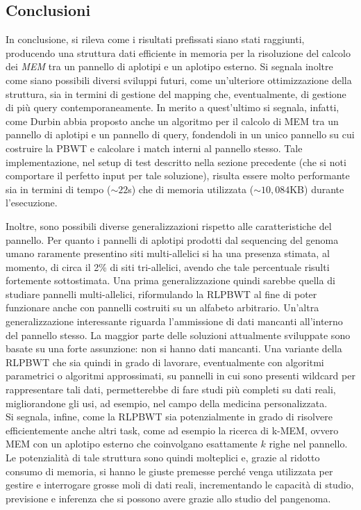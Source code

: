 \documentclass[a4paper,11pt, oneside,italian]{article}
\begin{document}
\subsection*{Conclusioni}
In conclusione, si rileva come i risultati prefissati siano stati raggiunti,
producendo una struttura dati efficiente in memoria per la risoluzione del
calcolo dei \textit{MEM} tra un pannello di aplotipi e un aplotipo
esterno.  
Si segnala inoltre come siano possibili diversi sviluppi futuri, come
un'ulteriore ottimizzazione della struttura, sia in termini 
di gestione del mapping che, eventualmente, di gestione di più query
contemporaneamente. In merito a quest'ultimo si segnala, infatti, come Durbin
abbia proposto anche un algoritmo per il calcolo di MEM tra un pannello di
aplotipi e un pannello di query, fondendoli in un unico pannello su cui
costruire la PBWT e calcolare i match interni al pannello stesso. Tale
implementazione, nel setup di test 
descritto nella sezione precedente (che si noti comportare il perfetto input per
tale soluzione), risulta essere molto performante sia in
termini di tempo ($\sim 22$s) che di memoria utilizzata ($\sim
10,084$KB) durante l'esecuzione. 

Inoltre, sono possibili diverse generalizzazioni rispetto alle caratteristiche
del pannello. Per quanto i pannelli di aplotipi prodotti dal sequencing del
genoma umano raramente presentino siti multi-allelici si ha una 
presenza stimata, al momento, di circa il 2\% di siti tri-allelici, avendo che
tale percentuale risulti fortemente sottostimata. Una prima generalizzazione
quindi sarebbe quella di studiare pannelli multi-allelici, riformulando la
RLPBWT al fine di poter funzionare anche con pannelli costruiti su un
alfabeto arbitrario. Un'altra generalizzazione interessante riguarda
l'ammissione di 
dati mancanti all'interno del pannello stesso. La maggior parte delle soluzioni
attualmente sviluppate sono basate su una forte assunzione: non si hanno dati
mancanti. Una variante della RLPBWT che sia quindi in grado di
lavorare, eventualmente con algoritmi parametrici o algoritmi
  approssimati, 
su pannelli in cui sono presenti wildcard per rappresentare tali dati,
permetterebbe di fare studi più completi su dati reali, migliorandone gli usi,
ad esempio, nel campo della medicina personalizzata.\\ 
Si segnala, infine, come la RLPBWT sia potenzialmente in grado di
risolvere 
efficientemente anche altri task, come ad esempio la ricerca di k-MEM,
ovvero MEM con un aplotipo esterno che coinvolgano
esattamente $k$ righe nel pannello. \\
Le potenzialità di tale struttura sono quindi molteplici e, grazie al ridotto
consumo di memoria, si hanno le giuste premesse perché venga utilizzata per
gestire e interrogare grosse moli di dati reali, incrementando le capacità di
studio, previsione e inferenza che si possono avere grazie allo studio del
pangenoma.
\end{document}
